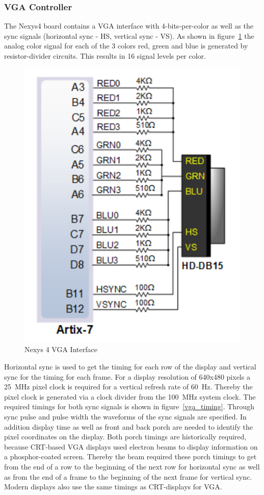         \subsubsection{VGA Controller}
            The Nexys4 board contains a VGA interface with 4-bits-per-color as well as the sync signals (horizontal sync - HS, vertical sync - VS). As shown in figure~\ref{vga_inf} the analog color signal for each of the 3 colors red, green and blue is generated by resistor-divider circuits. This results in 16 signal levels per color. 
	        \begin{figure}[h]
		        \centering
		        \includegraphics[scale=0.4]{images/vga_interface.png}
		        \caption{Nexys 4 VGA Interface}
		        \label{vga_inf}
	        \end{figure}
            Horizontal sync is used to get the timing for each row of the display and vertical sync for the timing for each frame. For a display resolution of 640x480 pixels a 25~MHz pixel clock is required for a vertical refresh rate of 60~Hz. Thereby the pixel clock is generated via a clock divider from the 100~MHz system clock. The required timings for both sync signals is shown in figure~\ref{vga_timing}. Through sync pulse and pulse width the waveforms of the sync signals are specified. In addition display time as well as front and back porch are needed to identify the pixel coordinates on the display. Both porch timings are historically required, because CRT-based VGA displays used electron beams to display information on a phosphor-coated screen. Thereby the beam required these porch timings to get from the end of a row to the beginning of the next row for horizontal sync as well as from the end of a frame to the beginning of the next frame for vertical sync. Modern displays also use the same timings as CRT-displays for VGA.\\
